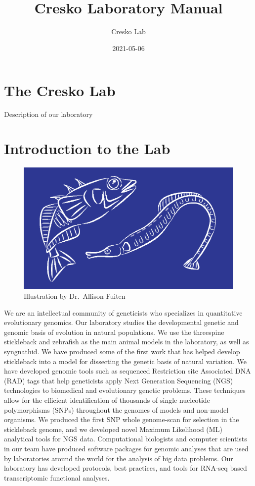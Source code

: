 \documentclass[
]{book}
\title{Cresko Laboratory Manual}
\author{Cresko Lab}
\date{2021-05-06}
\begin{document}
\maketitle

{
\setcounter{tocdepth}{1}
\tableofcontents
}
\hypertarget{the-cresko-lab}{%
\chapter{The Cresko Lab}\label{the-cresko-lab}}

Description of our laboratory

\hypertarget{introduction-to-the-lab}{%
\chapter{Introduction to the Lab}\label{introduction-to-the-lab}}

\begin{figure}
\centering
\includegraphics{images/Lab_logo.png}
\caption{Illustration by Dr.~Allison Fuiten}
\end{figure}

We are an intellectual community of geneticists who specializes in quantitative evolutionary genomics. Our laboratory studies the developmental genetic and genomic basis of evolution in natural populations. We use the threespine stickleback and zebrafish as the main animal models in the laboratory, as well as syngnathid. We have produced some of the first work that has helped develop stickleback into a model for dissecting the genetic basis of natural variation. We have developed genomic tools such as sequenced Restriction site Associated DNA (RAD) tags that help geneticists apply Next Generation Sequencing (NGS) technologies to biomedical and evolutionary genetic problems. These techniques allow for the efficient identification of thousands of single nucleotide polymorphisms (SNPs) throughout the genomes of models and non-model organisms. We produced the first SNP whole genome-scan for selection in the stickleback genome, and we developed novel Maximum Likelihood (ML) analytical tools for NGS data. Computational biologists and computer scientists in our team have produced software packages for genomic analyses that are used by laboratories around the world for the analysis of big data problems. Our laboratory has developed protocols, best practices, and tools for RNA-seq based transcriptomic functional analyses.
\end{document}
